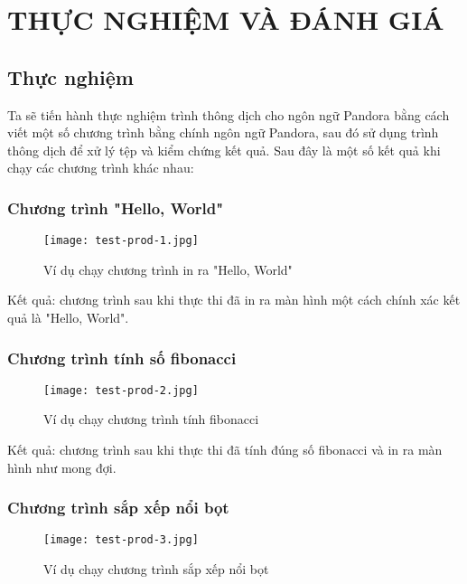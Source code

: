 \chapter{THỰC NGHIỆM VÀ ĐÁNH GIÁ} %

\section{Thực nghiệm}

    Ta sẽ tiến hành thực nghiệm trình thông dịch cho ngôn ngữ Pandora bằng cách viết một số chương trình bằng chính ngôn ngữ Pandora, sau đó sử dụng trình thông dịch để xử lý tệp và kiểm chứng kết quả. Sau đây là một số kết quả khi chạy các chương trình khác nhau:

\subsection{Chương trình "Hello, World"}

\begin{figure}[H]
    \centering
    \texttt{[image: test-prod-1.jpg]}
    \caption{Ví dụ chạy chương trình in ra "Hello, World"}
\end{figure}

    Kết quả: chương trình sau khi thực thi đã in ra màn hình một cách chính xác kết quả là "Hello, World".

\subsection{Chương trình tính số fibonacci}

\begin{figure}[H]
    \centering
    \texttt{[image: test-prod-2.jpg]}
    \caption{Ví dụ chạy chương trình tính fibonacci}
\end{figure}

    Kết quả: chương trình sau khi thực thi đã tính đúng số fibonacci và in ra màn hình như mong đợi.

\subsection{Chương trình sắp xếp nổi bọt}

\begin{figure}[H]
    \centering
    \texttt{[image: test-prod-3.jpg]}
    \caption{Ví dụ chạy chương trình sắp xếp nổi bọt}
\end{figure}

